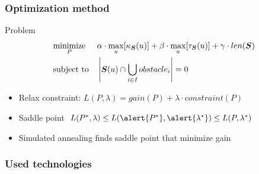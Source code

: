 \begin{frame}
  \frametitle{Optimization method}
  \begin{block}{Problem}
    \begin{equation*}
      \begin{aligned}
        & \underset{P}{\text{minimize}}
        & & \alpha\cdot \max_u[\kappa_{\boldsymbol{S}}(u)]+\beta\cdot
        \max_u[\tau_{\boldsymbol{S}}(u)]+\gamma\cdot len(\boldsymbol{S}) \\
        & \text{subject to}
        & & \left|\boldsymbol{S}(u)\cap \bigcup_{i\in I}obstacle_i\right| = 0
      \end{aligned}
    \end{equation*}\pause
  \end{block}
  \begin{itemize}
  \item \alert{Relax} constraint: $L(P,\lambda)=gain(P)+\lambda\cdot constraint(P)$\pause
  \item \alert{Saddle} point $L(P^*,\lambda)\leq L(\alert{P^*},
    \alert{\lambda^*})\leq L(P,\lambda^*)$\pause
  \item \alert{Simulated annealing} finds saddle point that minimize gain
  \end{itemize}
\end{frame}

\begin{frame}
  \frametitle{Used technologies}
  \begin{center}
    \\[1cm]
    \\[1cm]
  \end{center}
\end{frame}

